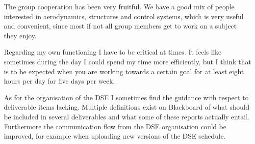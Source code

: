 The group cooperation has been very fruitful. We have a good mix of people interested in aerodynamics, structures and control systems, which is very useful and convenient, since most if not all group members get to work on a subject they enjoy.

Regarding my own functioning I have to be critical at times. It feels like sometimes during the day I could spend my time more efficiently, but I think that is to be expected when you are working towards a certain goal for at least eight hours per day for five days per week.

As for the organisation of the DSE I sometimes find the guidance with respect to deliverable items lacking. Multiple definitions exist on Blackboard of what should be included in several deliverables and what some of these reports actually entail. Furthermore the communication flow from the DSE organisation could be improved, for example when uploading new versions of the DSE schedule.